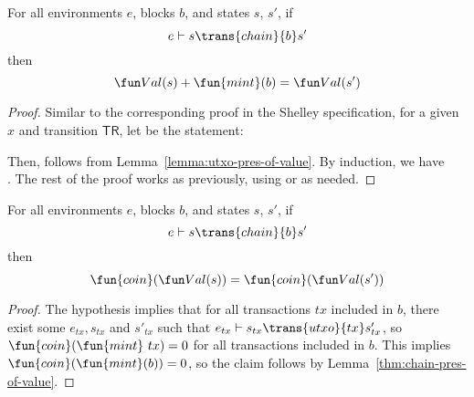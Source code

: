 \begin{theorem}
  \label{thm:chain-pres-of-value}
  For all environments $e$, blocks $b$, and states $s$, $s'$, if
  \begin{equation*}
    e\vdash s\trans{chain}{b}s'
  \end{equation*}
  then
  \begin{equation*}
    \Val(s) + \fun{mint}(b) = \Val(s')
  \end{equation*}
\end{theorem}
\begin{proof}
  Similar to the corresponding proof in the Shelley specification,
  for a given $x$ and transition $\mathsf{TR}$, let 
  be the statement:

  \noindent
  Then,  follows from
  Lemma~\ref{lemma:utxo-pres-of-value}.  By induction, we have \\
  . The rest of the proof works as
  previously, using  or  as needed.
\end{proof}

\begin{theorem}
  \label{thm:chain-pres-of-ada}
  For all environments $e$, blocks $b$, and states $s$, $s'$, if
  \begin{equation*}
    e\vdash s\trans{chain}{b}s'
  \end{equation*}
  then
  \begin{equation*}
    \fun{coin}(\Val(s)) = \fun{coin}(\Val(s'))
  \end{equation*}
\end{theorem}
\begin{proof}
  The hypothesis implies that for all transactions $tx$ included in
  $b$, there exist some $e_{tx}, s_{tx}$ and $s'_{tx}$ such that
  $e_{tx}\vdash s_{tx}\trans{utxo}{tx}s'_{tx}$, so
  $\fun{coin}(\fun{mint}~tx) = 0$ for all transactions included
  in $b$. This implies $\fun{coin}(\fun{mint}(b)) = 0$, so the
  claim follows by Lemma~\ref{thm:chain-pres-of-value}.
\end{proof}
